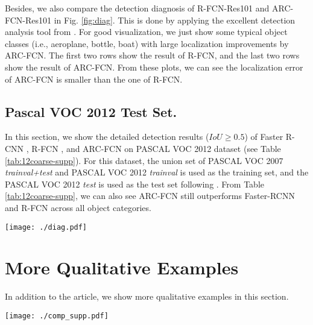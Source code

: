 \documentclass[10pt,twocolumn,letterpaper]{article}
\begin{document}
\begin{appendix}
Besides, we also compare the detection diagnosis of R-FCN-Res101 and ARC-FCN-Res101 in Fig. \ref{fig:diag}. This is done by applying the excellent detection analysis tool from \cite{hoiem_diag}. 
For good visualization, we just show some typical object classes (i.e., aeroplane, bottle, boat) with large localization improvements by ARC-FCN.
The first two rows show the result of R-FCN, and the last two rows show the result of ARC-FCN. From these plots, we can see the localization error of ARC-FCN is smaller than the one of R-FCN.

\subsection{Pascal VOC 2012 Test Set.}
In this section, we show the detailed detection results ($IoU \ge 0.5$) of Faster R-CNN \cite{faster_rcnn}, R-FCN \cite{rfcn}, and ARC-FCN on PASCAL VOC 2012 dataset (see Table \ref{tab:12coarse-supp}). 
For this dataset, the union set of PASCAL VOC 2007 \textit{trainval+test} and PASCAL VOC 2012 \textit{trainval} is used as the training set, and the PASCAL VOC 2012 \textit{test} is used as the test set following \cite{faster_rcnn,rfcn}.
From Table \ref{tab:12coarse-supp}, we can also see ARC-FCN still outperforms Faster-RCNN and R-FCN across all object categories.



\begin{figure*}
\centering
{\texttt{[image: ./diag.pdf]}}
\caption{False positive/detection trends with rank. 
Detection analysis of R-FCN are shown on the first $2$ rows. Detection analysis of ARC-FCN are shown on the last $2$ rows.
The First and Third Rows: type of detection as number of detections increases; 
The Second and Fourth Rows: stacked area plot showing fraction of FP of each type as the total number of FP increase.
line plots show recall as function of the number of objects (dashed=weak localization, solid=strong localization).}
\label{fig:diag}
\end{figure*}

\section{More Qualitative Examples}

In addition to the article, we show more qualitative examples in this section.

\begin{figure*}
\centering
{\texttt{[image: ./comp\_supp.pdf]}}
\caption{Sample detections of R-FCN-Res101 \cite{rfcn} (blue) and ARC-FCN-Res101 (red). For comparison, we also show the groundtruth bounding box (green). The score threshold is set to $0.6$ for good visualization. Best viewed in color and zoom in. %
}
\label{fig:comp_supp}
\end{figure*} 


\end{appendix}
\end{document}
